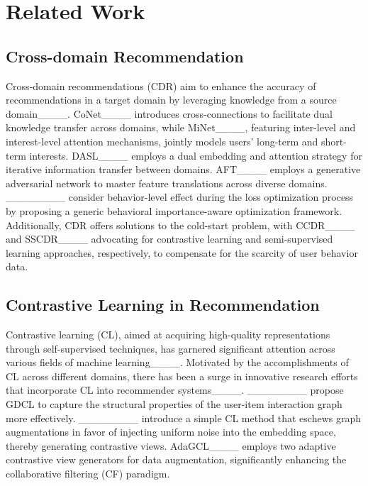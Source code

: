 \section{Related Work}
\label{sec:related-works}
\subsection{Cross-domain Recommendation}
Cross-domain recommendations (CDR) aim to enhance the accuracy of recommendations in a target domain by leveraging knowledge from a source domain____. CoNet____ introduces cross-connections to facilitate dual knowledge transfer across domains, while MiNet____, featuring inter-level and interest-level attention mechanisms, jointly models users' long-term and short-term interests. DASL____ employs a dual embedding and attention strategy for iterative information transfer between domains. AFT____ employs a generative adversarial network to master feature translations across diverse domains. ________ consider behavior-level effect during the loss optimization process by proposing a generic behavioral importance-aware optimization framework. Additionally, CDR offers solutions to the cold-start problem, with CCDR____ and SSCDR____ advocating for contrastive learning and semi-supervised learning approaches, respectively, to compensate for the scarcity of user behavior data.

\subsection{Contrastive Learning in Recommendation}
Contrastive learning (CL), aimed at acquiring high-quality representations through self-supervised techniques, has garnered significant attention across various fields of machine learning____. Motivated by the accomplishments of CL across different domains, there has been a surge in innovative research efforts that incorporate CL into recommender systems____. ________ propose GDCL to capture the structural properties of the user-item interaction graph more effectively. ________ introduce a simple CL method that eschews graph augmentations in favor of injecting uniform noise into the embedding space, thereby generating contrastive views. AdaGCL____ employs two adaptive contrastive view generators for data augmentation, significantly enhancing the collaborative filtering (CF) paradigm.